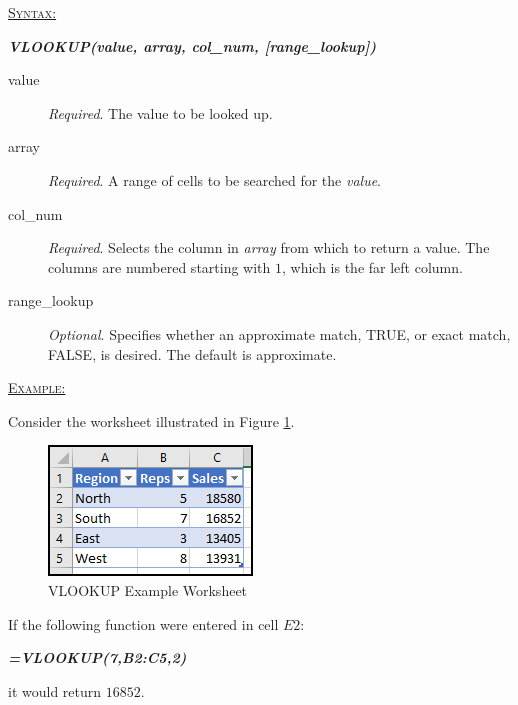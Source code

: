 \begin{addmargin}[1cm]{0cm}
	
	\medskip
	\underline{\textsc{Syntax:}}
	\medskip
	
	{\color{Syntax}
		\noindent\textbf{\textit{VLOOKUP(value, array, col\_num, [range\_lookup])}}
	}
	
	\begin{description}
		\item[value] \textit{Required}. The value to be looked up.
		\item[array] \textit{Required}. A range of cells to be searched for the \textit{value}.
		\item[col\_num] \textit{Required}. Selects the column in \textit{array} from which to return a value. The columns are numbered starting with $ 1 $, which is the far left column. 
		\item[range\_lookup] \textit{Optional}. Specifies whether an approximate match, TRUE, or exact match, FALSE, is desired. The default is approximate.
	\end{description}

	\medskip
	\noindent\underline{\textsc{Example:}}
	\medskip
	
	\noindent Consider the worksheet illustrated in Figure \ref{apa:vlk}.
	
	\begin{figure}[H]
		\centering
		\includegraphics[width=\maxwidth{.45\linewidth}]{gfx/apa_fig01}
		\caption{VLOOKUP Example Worksheet}
		\label{apa:vlk}
	\end{figure}
	
	\noindent If the following function were entered in cell $ E2 $:
	
	{\color{Syntax}
		\textit{\textbf{=VLOOKUP(7,B2:C5,2)}}
	}
	
	\noindent it would return $ 16852 $.

\end{addmargin}




